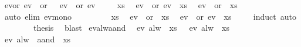 \begin{isabellebody}
\isamarkupfalse%
%
\endisatagproof
{\isafoldproof}%
%
\isadelimproof
\isanewline
%
\endisadelimproof
\isanewline
{}\isamarkupfalse%
\ ev{\isacharunderscore}or{\isacharcolon}\ {\isachardoublequoteopen}ev\ {\isacharparenleft}{\isasymphi}\ or\ {\isasympsi}{\isacharparenright}\ {\isacharequal}\ ev\ {\isasymphi}\ or\ ev\ {\isasympsi}{\isachardoublequoteclose}\isanewline
%
\isadelimproof
%
\endisadelimproof
%
\isatagproof
{}\isamarkupfalse%
{\isacharminus}\isanewline
\ \ \isacommand{{\isacharbraceleft}}\isamarkupfalse%
\isamarkupfalse%
\ xs\ \isamarkupfalse%
\ {\isachardoublequoteopen}{\isacharparenleft}ev\ {\isasymphi}\ or\ ev\ {\isasympsi}{\isacharparenright}\ xs{\isachardoublequoteclose}\ \isamarkupfalse%
\ {\isachardoublequoteopen}ev\ {\isacharparenleft}{\isasymphi}\ or\ {\isasympsi}{\isacharparenright}\ xs{\isachardoublequoteclose}\isanewline
\ \ \ \isamarkupfalse%
\ {\isacharparenleft}auto\ elim{\isacharcolon}\ ev{\isacharunderscore}mono{\isacharparenright}\isanewline
\ \ \isacommand{{\isacharbraceright}}\isamarkupfalse%
\isanewline
\ \ \isamarkupfalse%
\isanewline
\ \ \isacommand{{\isacharbraceleft}}\isamarkupfalse%
\isamarkupfalse%
\ xs\ \isamarkupfalse%
\ {\isachardoublequoteopen}ev\ {\isacharparenleft}{\isasymphi}\ or\ {\isasympsi}{\isacharparenright}\ xs{\isachardoublequoteclose}\ \isamarkupfalse%
\ {\isachardoublequoteopen}{\isacharparenleft}ev\ {\isasymphi}\ or\ ev\ {\isasympsi}{\isacharparenright}\ xs{\isachardoublequoteclose}\isanewline
\ \ \ \isamarkupfalse%
\ induct\ auto\isanewline
\ \ \isacommand{{\isacharbraceright}}\isamarkupfalse%
\isanewline
\ \ \isamarkupfalse%
\ \isamarkupfalse%
\ {\isacharquery}thesis\ \isamarkupfalse%
\ blast\isanewline
{}\isamarkupfalse%
%
\endisatagproof
{\isafoldproof}%
%
\isadelimproof
\isanewline
%
\endisadelimproof
\isanewline
{}\isamarkupfalse%
\ ev{\isacharunderscore}alw{\isacharunderscore}aand{\isacharcolon}\isanewline
{}\ {\isasymphi}{\isacharcolon}\ {\isachardoublequoteopen}ev\ {\isacharparenleft}alw\ {\isasymphi}{\isacharparenright}\ xs{\isachardoublequoteclose}\ \ {\isasympsi}{\isacharcolon}\ {\isachardoublequoteopen}ev\ {\isacharparenleft}alw\ {\isasympsi}{\isacharparenright}\ xs{\isachardoublequoteclose}\isanewline
{}\ {\isachardoublequoteopen}ev\ {\isacharparenleft}alw\ {\isacharparenleft}{\isasymphi}\ aand\ {\isasympsi}{\isacharparenright}{\isacharparenright}\ xs{\isachardoublequoteclose}\isanewline

\end{isabellebody}
